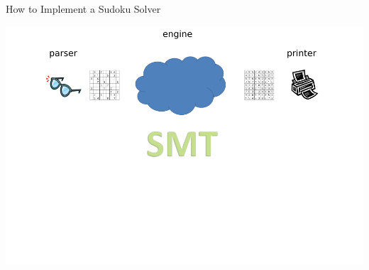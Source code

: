 \documentclass{beamer}
\begin{document}
\begin{frame}{How to Implement a Sudoku Solver}
\begin{overprint}
 \includegraphics[width=\textwidth]{current11}
\end{overprint}
\end{frame}
 
\end{document}
